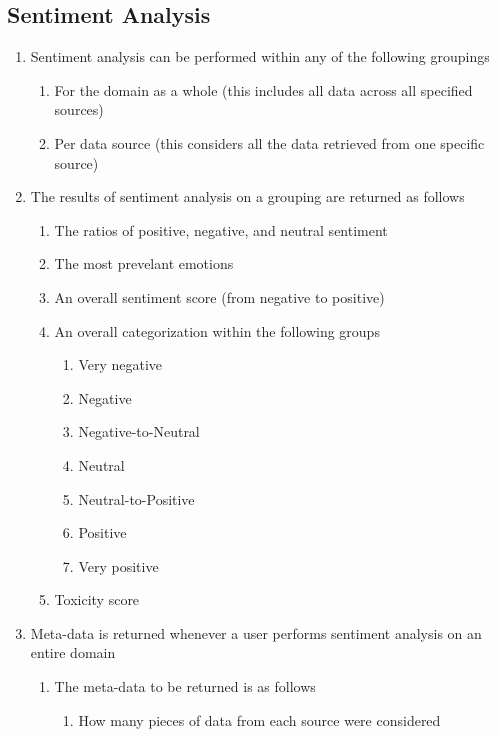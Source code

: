 \documentclass[12pt]{article}
\begin{document}
\subsection{Sentiment Analysis}
\begin{enumerate}
  \item Sentiment analysis can be performed within any of the following groupings
        \begin{enumerate}
          \item For the domain as a whole (this includes all data across all specified sources)
          \item Per data source (this considers all the data retrieved from one specific source)
        \end{enumerate}
  \item The results of sentiment analysis on a grouping are returned as follows
        \begin{enumerate}
          \item The ratios of positive, negative, and neutral sentiment
          \item The most prevelant emotions
          \item An overall sentiment score (from negative to positive)
          \item An overall categorization within the following groups
                \begin{enumerate}
                  \item Very negative
                  \item Negative
                  \item Negative-to-Neutral
                  \item Neutral
                  \item Neutral-to-Positive
                  \item Positive
                  \item Very positive
                \end{enumerate}
          \item Toxicity score
        \end{enumerate}
  \item Meta-data is returned whenever a user performs sentiment analysis on an entire domain
        \begin{enumerate}
          \item The meta-data to be returned is as follows
                \begin{enumerate}
                  \item How many pieces of data from each source were considered

\end{enumerate}
\end{enumerate}
\end{enumerate}
\end{document}
